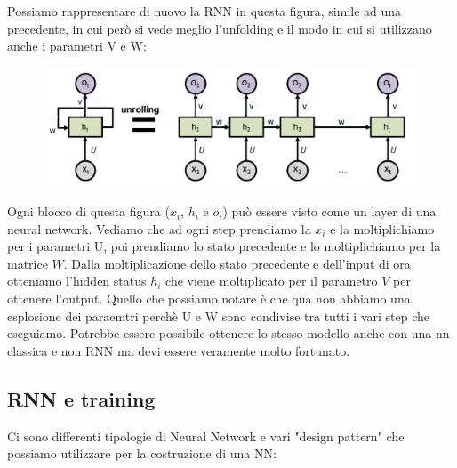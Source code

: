 \documentclass[14pt]{extreport}
\begin{document}
Possiamo rappresentare di nuovo la RNN in questa figura, simile ad una precedente, in cui però si vede meglio l'unfolding e il modo in cui si utilizzano anche i parametri V e W:

\begin{figure}[H]
\centering
\includegraphics[width=0.7\linewidth]{419.jpeg}
\end{figure}

Ogni blocco di questa figura ($x_i$, $h_i$ e $o_i$) può essere visto come un layer di una neural network.
Vediamo che ad ogni step prendiamo la $x_i$ e la moltiplichiamo per i parametri U, poi prendiamo lo stato precedente e lo moltiplichiamo per la matrice 
$W$. Dalla moltiplicazione dello stato precedente e dell'input di ora otteniamo l'hidden status $h_i$ che viene moltiplicato per il parametro $V$ per ottenere l'output.
Quello che possiamo notare è che qua non abbiamo una esplosione dei paraemtri perchè U e W sono condivise tra tutti i vari step che eseguiamo.
Potrebbe essere possibile ottenere lo stesso modello anche con una nn classica e non RNN ma devi essere veramente molto fortunato.


\subsection{RNN e training}

Ci sono differenti tipologie di Neural Network e vari "design pattern" che possiamo utilizzare per la costruzione di una NN:
\end{document}
